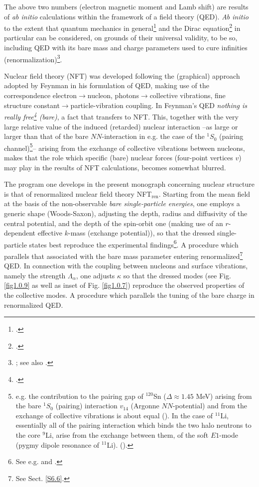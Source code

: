 The above two numbers (electron magnetic moment and Lamb shift) are results of \textit{ab initio} calculations within the framework of a field theory (QED). \textit{Ab initio} to the extent that quantum mechanics in general\footnote{\cite{Heisenberg:25,Born:25a,Born:25b,Dirac:25,Schrodinger:26,Born:26,Heisenberg:27,Pauli:25}.} and the Dirac equation\footnote{\cite{Dirac:28a,Dirac:28b}.} in particular can be considered, on grounds of their universal validity, to be so, including QED with its bare mass and charge parameters used to cure infinities (renormalization)\footnote{\cite{Feynman:49,Schwinger:48,Tomonaga:46}; see also \cite{Dyson:49,Schwinger:58,Schweber:94}.}.

Nuclear field theory (NFT) was developed following the (graphical) approach adopted by Feynman in his formulation of QED, making use of the correspondence electron$\to$nucleon, photons$\to$collective vibrations, fine structure constant$\to$particle-vibration coupling. In Feynman's QED \textit{nothing is really free\footnote{\cite{Feynman:75}.} (bare)}, a fact that transfers to NFT.  This, together with the very large relative value of the induced (retarded) nuclear  interaction --as large or larger than that of the bare $NN$-interaction in e.g. the case of the $^1S_0$ (pairing channel)\footnote{e.g. the contribution to the pairing gap of $^{120}$Sn ($\Delta\approx1.45$ MeV) arising from the bare $^1S_0$ (pairing) interaction $v_{14}$ (Argonne $NN$-potential) and from the exchange of collective vibrations is about equal (\cite{Idini:15}). In the case of $^{11}$Li, essentially all of the pairing interaction which binds the two halo neutrons to the core $^9$Li, arise from the exchange between them, of the soft $E1$-mode (pygmy dipole resonance  of $^{11}$Li). (\cite{Barranco:01,Broglia:19}). }-- arising from the exchange of collective vibrations between nucleons, makes that the role which specific (bare) nuclear forces (four-point vertices $v$) may play in the results of NFT calculations, becomes somewhat blurred. 


The program one develops in the present monograph concerning nuclear structure is that of renormalized nuclear field theory NFT$_{\text{ren}}$. Starting from the mean field  at the basis of the non-observable \textit{bare single-particle energies}, one employs a generic shape (Woods-Saxon), adjusting the depth, radius and diffusivity of the central potential, and the depth of the spin-orbit one (making use of an $r$-dependent effective $k$-mass (exchange potential)), so that the dressed single-particle states best reproduce the experimental findings\footnote{See e.g. \cite{Barranco:17} and \cite{Barranco:20}.}. A procedure which parallels that associated with the bare mass parameter entering renormalized\footnote{See Sect. \ref{S6.6}.} QED.
In connection with the coupling between nucleons and surface vibrations, namely the strength $\Lambda_\alpha$, one adjusts $\kappa$ so that the dressed modes (see Fig. \ref{fig1.0.9} as well as inset of Fig. \ref{fig1.0.7}) reproduce the observed properties of the collective modes. A procedure which parallels the tuning of the bare charge  in renormalized QED. 





